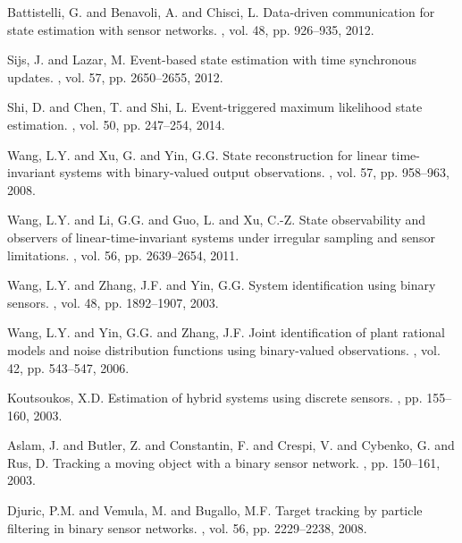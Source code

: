 \documentclass[11pt,journal,onecolumn]{IEEEtran}
\begin{document}
\begin{thebibliography}{10}

Battistelli, G. and Benavoli, A. and Chisci, L.
\newblock Data-driven communication for state estimation with sensor networks.
, vol. 48, pp. 926--935, 2012.

Sijs, J. and Lazar, M.
\newblock Event-based state estimation with time synchronous updates.
, vol. 57, pp. 2650--2655, 2012.

Shi, D. and Chen, T. and Shi, L.
\newblock Event-triggered maximum likelihood state estimation.
, vol. 50, pp. 247--254, 2014.

Wang, L.Y. and Xu, G. and Yin, G.G.
\newblock State reconstruction for linear time-invariant systems with binary-valued output observations.
, vol. 57, pp. 958--963, 2008.

Wang, L.Y. and Li, G.G. and Guo, L. and Xu, C.-Z.
\newblock State observability and observers of linear-time-invariant systems under irregular sampling and sensor limitations.
, vol. 56, pp. 2639--2654, 2011.

Wang, L.Y. and Zhang, J.F. and Yin, G.G.
\newblock System identification using binary sensors.
, vol. 48, pp. 1892--1907, 2003.

Wang, L.Y. and Yin, G.G. and Zhang, J.F.
\newblock Joint identification of plant rational models and noise distribution functions using binary-valued observations.
, vol. 42, pp. 543--547, 2006.

Koutsoukos, X.D.
\newblock Estimation of hybrid systems using discrete sensors.
, pp. 155--160, 2003.

Aslam, J. and Butler, Z. and Constantin, F. and Crespi, V. and Cybenko, G. and Rus, D.
\newblock Tracking a moving object with a binary sensor network.
, pp. 150--161, 2003.

Djuric, P.M. and Vemula, M. and Bugallo, M.F.
\newblock Target tracking by particle filtering in binary sensor networks.
, vol. 56, pp. 2229--2238, 2008.


\end{thebibliography}
\end{document}
